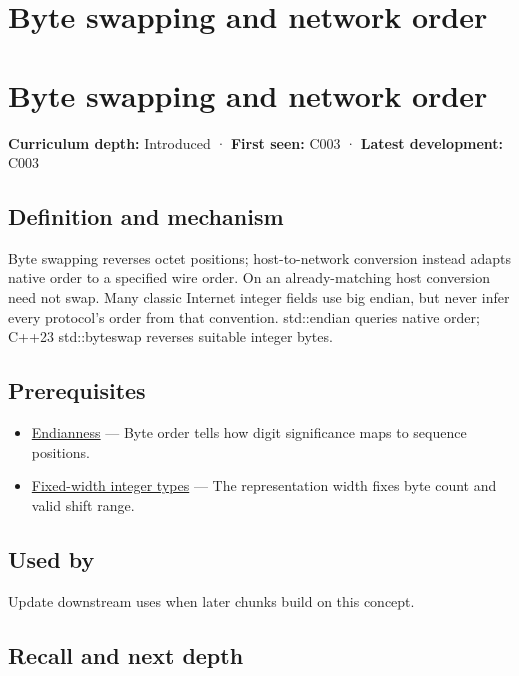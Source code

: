 \hypertarget{appendix-11ba36693aa2}{}
\section*{Byte swapping and network order}
\section{Byte swapping and network order}\label{byte-swapping-and-network-order}

\textbf{Curriculum depth:} Introduced · \textbf{First seen:} C003 · \textbf{Latest development:} C003

\subsection{Definition and mechanism}\label{definition-and-mechanism}

Byte swapping reverses octet positions; host-to-network conversion instead adapts native order to a specified wire order. On an already-matching host conversion need not swap. Many classic Internet integer fields use big endian, but never infer every protocol's order from that convention. std::endian queries native order; C++23 std::byteswap reverses suitable integer bytes.

\subsection{Prerequisites}\label{prerequisites}

\begin{itemize}
\tightlist
\item
  \hyperref[appendix-bc07c3d25b18]{Endianness} --- Byte order tells how digit significance maps to sequence positions.
\item
  \hyperref[appendix-cc04044b5782]{Fixed-width integer types} --- The representation width fixes byte count and valid shift range.
\end{itemize}

\subsection{Used by}\label{used-by}

Update downstream uses when later chunks build on this concept.

\subsection{Recall and next depth}\label{recall-and-next-depth}

